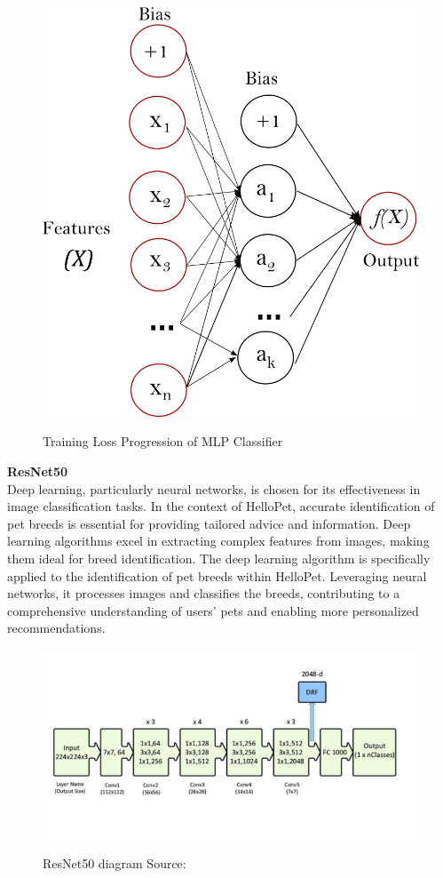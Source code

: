 \begin{figure}[H]
\centering
\includegraphics[width=0.53\linewidth]{img/MLP Classidier.png}
\\
 \caption{Training Loss Progression of MLP Classifier}
\label{fig:system-overview}
\end{figure}
\newpage
\noindent\textbf{{ResNet50}}\\
Deep learning, particularly neural networks, is chosen for its effectiveness in image classification tasks. In the context of HelloPet, accurate identification of pet breeds is essential for providing tailored advice and information. Deep learning algorithms excel in extracting complex features from images, making them ideal for breed identification.
The deep learning algorithm is specifically applied to the identification of pet breeds within HelloPet. Leveraging neural networks, it processes images and classifies the breeds, contributing to a comprehensive understanding of users' pets and enabling more personalized recommendations.
\begin{figure}[H]
\centering
\includegraphics[width=0.75\linewidth]{img/lIAhY.png}
\\
\caption{ResNet50 diagram Source: \cite{22}}
\label{fig:system-overview}
\end{figure}

